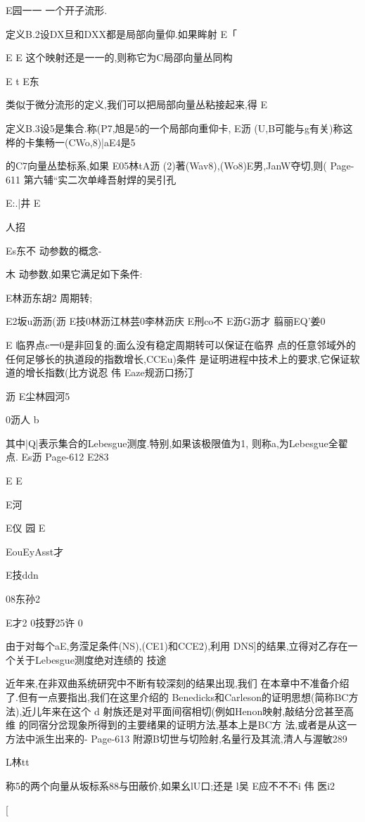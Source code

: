 {E园一一
一个开子流形.

定义B.2设DX旦和DXX都是局部向量仰.如果眸射
E「

E
E
这个映射还是一一的,则称它为C局邵向量丛同构

E
t
E东

类似于微分流形的定义,我们可以把局部向量丛粘接起来,得
E

定义B.3设5是集合.称(P7,旭是5的一个局部向重仰卡,
E沥
(U,B可能与g有关)称这桦的卡集畅一(CWo,8)|aE4是5

的C7向量丛垫标系,如果
E05林tA沥
(2)著(Wav8),(Wo8)E男,JanW夺切,则(
Page-611
第六辅“实二次单峰吾射焊的吴引孔

E:.|井
E

人招

Es东不
动参数的概念-

木
动参数,如果它满足如下条件:

E林沥东胡2
周期转;

E2坂u沥沥(沥
E技0林沥江林芸0李林沥庆
E刑co不
E沥G沥才
翦丽EQ'姜0

E
临界点c一0是非回复的;面么没有稳定周期转可以保证在临界
点的任意邻域外的任何足够长的执道段的指数增长,CCEu)条件
是证明进程中技术上的要求,它保证软道的增长指数(比方说忍
伟
Eaze规沥口扬汀

沥
E尘林园河5

0沥人
b

其中|Q|表示集合的Lebesgue测度.特别,如果该极限值为1,
则称a,为Lebesgue全翟点.
Es沥
Page-612
E283

E
E

E河

E仪
园
E

EouEyAsst才

E技ddn

08东孙2

E才2
0技野25许
0

由于对每个aE,务滢足条件(NS),(CE1)和CCE2),利用
DNS]的结果,立得对乙存在一个关于Lebesgue测度绝对连绩的
技途

近年来,在非双曲系统研究中不断有较深刻的结果出现,我们
在本章中不准备介绍了.但有一点要指出,我们在这里介绍的
Benedicks和Carleson的证明思想(简称BC方法),近儿年来在这个
d
射族还是对平面间宿相切(例如Henon映射,敲结分岔甚至高维
的同宿分岔现象所得到的主要绪果的证明方法,基本上是BC方
法,或者是从这一方法中派生出来的-
Page-613
附源B切世与切险射,名量行及其流,清人与渥敏289

L林tt

称5的两个向量从坂标系88与田蔽价,如果幺lU口;还是
l吴
E应不不不i
伟
医i2

[

}
